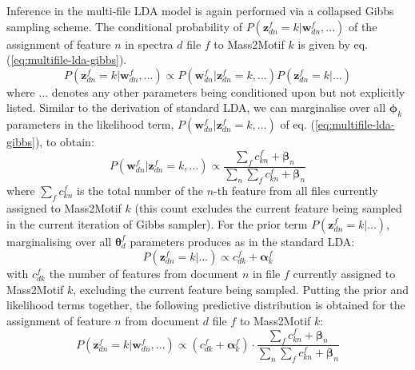 Inference in the multi-file LDA model is again performed via a collapsed Gibbs sampling scheme. The conditional probability of $P(\boldsymbol{z}_{dn}^f=k \vert \boldsymbol{w}_{dn}^f, ...)$ of the assignment of feature $n$ in spectra $d$ file $f$ to Mass2Motif $k$ is given by eq. (\ref{eq:multifile-lda-gibbs}).
\begin{equation}
P(\boldsymbol{z}_{dn}^f=k \vert \boldsymbol{w}_{dn}^f, ...) \propto P(\boldsymbol{w}_{dn}^f \vert \boldsymbol{z}_{dn}^f=k, ...) P(\boldsymbol{z}_{dn}^f=k \vert ...)
\label{eq:multifile-lda-gibbs}
\end{equation}
where $...$ denotes any other parameters being conditioned upon but not explicitly listed. Similar to the derivation of standard LDA, we can marginalise over all $\boldsymbol{\phi}_k$ parameters in the likelihood term, $P(\boldsymbol{w}_{dn}^f \vert \boldsymbol{z}_{dn}^f=k, ...)$ of eq. (\ref{eq:multifile-lda-gibbs}), to obtain:
\begin{equation}
P(\boldsymbol{w}_{dn}^f \vert \boldsymbol{z}_{dn}^f=k, ...) \propto \frac{\sum_{f} c_{kn}^f + \boldsymbol{\beta}_n}{\sum_{n}\sum_{f} c_{kn}^f + \boldsymbol{\beta}_n}
\label{eq:multifile-lda-gibbs-likelihood}
\end{equation}
where $\sum_{f} c_{kn}^f$ is the total number of the $n$-th feature from all files currently assigned to Mass2Motif $k$ (this count excludes the current feature being sampled in the current iteration of Gibbs sampler). For the prior term $P(\boldsymbol{z}_{dn}^f=k \vert ...)$, marginalising over all $\boldsymbol{\theta}_{d}^f$ parameters produces as in the standard LDA:
\begin{equation}
P(\boldsymbol{z}_{dn}^f=k \vert ...) \propto  c_{dk}^f + \boldsymbol{\alpha}^f_k
\label{eq:multifile-lda-gibbs-prior}
\end{equation}
with $c_{dk}^f$ the number of features from document $n$ in file $f$ currently assigned to Mass2Motif $k$, excluding the current feature being sampled. 
Putting the prior and likelihood terms together, the following predictive distribution is obtained for the assignment of feature $n$ from document $d$ file $f$ to Mass2Motif $k$:
\begin{equation}
P(\boldsymbol{z}_{dn}^f=k \vert \boldsymbol{w}_{dn}^f, ...) \propto (c_{dk}^f + \boldsymbol{\alpha}^f_k) \cdot \frac{\sum_{f} c_{kn}^f + \boldsymbol{\beta}_n}{\sum_{n}\sum_{f} c_{kn}^f + \boldsymbol{\beta}_n}
\label{eq:multifile-lda-gibbs-combined}
\end{equation}

